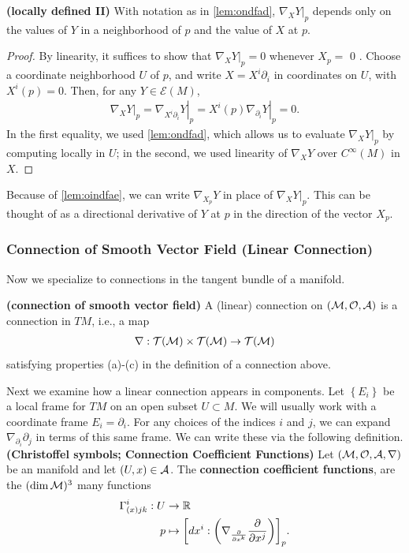 \documentclass[12pt]{article} %
\newcommand{\bfs}[1]{\textbf{({#1}) }}
\begin{document}
\begin{lema}\bfs{locally defined II}\label{lem:oindfae}
With notation as in \cref{lem:ondfad}, $\left.\nabla_{X} Y\right|_{p}$ depends only on the values of $Y$ in a neighborhood of $p$ and the value of $X$ at $p$.
\end{lema}
\begin{proof}
By linearity, it suffices to show that $\left.\nabla_{X} Y\right|_{p}=0$ whenever $X_{p}=$ 0 . Choose a coordinate neighborhood $U$ of $p$, and write $X=X^{i} \partial_{i}$ in coordinates on $U$, with $X^{i}(p)=0$. Then, for any $Y \in \mathcal{E}(M)$,
\begin{align*}
\left.\nabla_{X} Y\right|_{p}=\left.\nabla_{X^{i} \partial_{i}} Y\right|_{p}=\left.X^{i}(p) \nabla_{\partial_{i}} Y\right|_{p}=0 .
\end{align*}
In the first equality, we used \cref{lem:ondfad}, which allows us to evaluate $\left.\nabla_{X} Y\right|_{p}$ by computing locally in $U$; in the second, we used linearity of $\nabla_{X} Y$ over $C^{\infty}(M)$ in $X$.
\end{proof}
Because of \cref{lem:oindfae}, we can write $\nabla_{X_{p}} Y$ in place of $\left.\nabla_{X} Y\right|_{p}$. This can be thought of as a directional derivative of $Y$ at $p$ in the direction of the vector $X_{p}$.
\subsubsection{Connection of Smooth Vector Field (Linear Connection)}
Now we specialize to connections in the tangent bundle of a manifold. 
\begin{defa}\bfs{connection of smooth vector field}
A (linear) connection on $(\mathcal{M},\mathcal{O},\mathcal{A})$ is a connection in $T M$, i.e., a map
\begin{align*}
\nabla: \mathcal{T}(\mathcal{M}) \times \mathcal{T}(\mathcal{M}) \rightarrow \mathcal{T}(\mathcal{M})
\end{align*}
satisfying properties (a)-(c) in the definition of a connection above.
\end{defa}

Next we examine how a linear connection appears in components. Let $\left\{E_{i}\right\}$ be a local frame for $T M$ on an open subset $U \subset M$. We will usually work with a coordinate frame $E_{i}=\partial_{i}$. For any choices of the indices $i$ and $j$, we can expand $\nabla_{\partial_{i}} \partial_{j}$ in terms of this same frame.
We can write these via the following definition.
\bd\bfs{Christoffel symbols; Connection Coefficient Functions}\label{def:kidnafe}
    Let $(\mathcal{M},\mathcal{O},\mathcal{A},\nabla)$ be an manifold and let $(U,x)\in\mathcal{A}$. The \textbf{connection coefficient functions}, are the $(\dim \mathcal{M})^3$ many functions 
    \begin{align*} 
        \begin{split}
            \Gamma^i_{(x)jk} : U & \to \mathbb{R} \\
            p & \mapsto \bigg[dx^i :\bigg( \nabla_{\frac{\partial}{\partial x^k}} \frac{\partial}{\partial x^j}\bigg)\bigg]_p.
        \end{split}
    \end{align*}
\ed 
\end{document}
